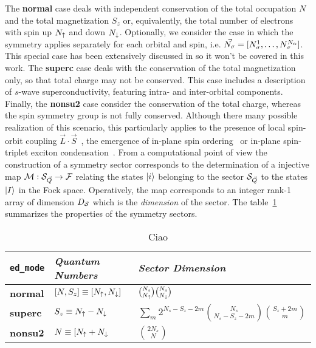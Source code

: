 \documentclass[edipack2.tex]{subfiles}
\begin{document}
The {\bf normal} case deals with independent conservation of the total occupation $N$
and the total magnetization $S_z$ or, equivalently, the total number of electrons with spin up $N_\uparrow$ and down
$N_\downarrow$. Optionally, we consider the case in which the symmetry
applies separately for each orbital and spin,
i.e. $\vec{N_\sigma}=[N^1_\sigma,\dots,N^{N_\alpha}_\sigma]$. This special case has been
extensively discussed in  so it won't be covered in
this work.
%
The {\bf superc} case deals with the conservation of the total
magnetization only, so that total charge may not be conserved. This
case includes a description of $s$-wave superconductivity, featuring
intra- and inter-orbital components.
%
Finally, the {\bf nonsu2} case consider the conservation of the total
charge, whereas the spin symmetry group is not fully
conserved. Although there many possible realization of this scenario,
this particularly applies to the presence of local spin-orbit coupling
$\vec{L}\cdot\vec{S}$~\cite{something}, the emergence of in-plane spin ordering~\cite{BellomiaKMH} or
in-plane spin-triplet exciton condensation~\cite{Amaricci2023_excitons,Blason}.  
%
From a computational point of view the construction of a symmetry
sector corresponds to the determination of a injective map
${\cal M}:{\cal S}_{\vec{Q}}\rightarrow {\cal F}$ relating the states $|i\rangle$
belonging to the sector ${\cal S}_{\vec{Q}}$ to the states $|I\rangle$ in the
Fock space. Operatively, the map corresponds to an integer rank-1
array of dimension $D_{\cal S}$ which is the {\it dimension} of the
sector. 
The table~\ref{TabSector} summarizes the properties of the symmetry
sectors. 

\begin{table}%
  \label{TabSector}
\begin{center}
\begin{tabularx}{\linewidth}{ |X|X|X| } 
 \hline
  {\tt ed\_mode} & {\it Quantum Numbers} & {\it Sector Dimension} \\
  \hline
  {\bf normal} & $[N,S_z]\equiv[N_\uparrow,N_\downarrow]$ &
                                                $\binom{N_s}{N_\uparrow}\binom{N_s}{N_\downarrow}$
  \\
  \hline
  {\bf superc} & $S_z\equiv N_\uparrow-N_\downarrow$ &  $\sum_m 2^{N_s-S_z-2m}\binom{N_s}{N_s-S_z-2m}\binom{S_z+2m}{m}$
  \\
  \hline
  {\bf nonsu2} & $N \equiv[N_\uparrow+N_\downarrow$ & $\binom{2N_s}{N}$ \\ 
 \hline
\end{tabularx}
\end{center}
\caption{Ciao}
\end{table}
\end{document}
